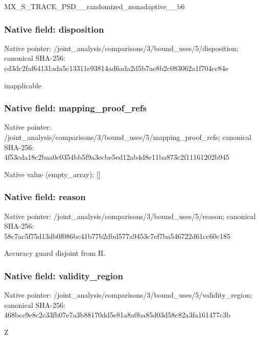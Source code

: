 \documentclass[10pt,a4paper]{article}
\begin{document}
\begingroup\raggedright\sloppy MX\_\allowbreak{}S\_\allowbreak{}TRACE\_\allowbreak{}PSD\_\allowbreak{}\_\allowbreak{}randomized\_\allowbreak{}nonadaptive\_\allowbreak{}\_\allowbreak{}b6\par\endgroup

\subsubsection{Native field: disposition}
Native pointer: /joint\_\allowbreak{}analysis/comparisons/3/bound\_\allowbreak{}uses/5/disposition; canonical SHA-256: cd3dc2faf64131ada5c13311e93814ad6ada2d5b7ae8b2c083062a1f704cc84e

\begingroup\raggedright\sloppy inapplicable\par\endgroup

\subsubsection{Native field: mapping\_\allowbreak{}proof\_\allowbreak{}refs}
Native pointer: /joint\_\allowbreak{}analysis/comparisons/3/bound\_\allowbreak{}uses/5/mapping\_\allowbreak{}proof\_\allowbreak{}refs; canonical SHA-256: 4f53cda18c2baa0c0354bb5f9a3ecbe5ed12ab4d8e11ba873c2f11161202b945

Native value (empty\_\allowbreak{}array): []

\subsubsection{Native field: reason}
Native pointer: /joint\_\allowbreak{}analysis/comparisons/3/bound\_\allowbreak{}uses/5/reason; canonical SHA-256: 58c7ac5f75d13db0f086bc41b77b2dbd577a9453c7ef7ba546722d61cc60c185

\begingroup\raggedright\sloppy Accuracy guard disjoint from H.\par\endgroup

\subsubsection{Native field: validity\_\allowbreak{}region}
Native pointer: /joint\_\allowbreak{}analysis/comparisons/3/bound\_\allowbreak{}uses/5/validity\_\allowbreak{}region; canonical SHA-256: 468bcc9e8c2c33fb07e7a3b88170dd5e81a8a0ba85d03d58c82a3fa161477c3b

\begingroup\raggedright\sloppy Z\par\endgroup
\end{document}
